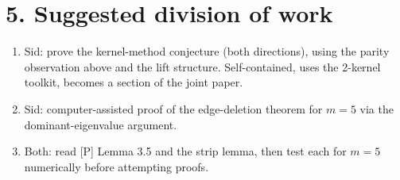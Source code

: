 \documentclass[11pt]{article}
\theoremstyle{remark}\newtheorem*{remark}{Remark}
\begin{document}
\section*{5. Suggested division of work}
\begin{enumerate}[leftmargin=1.5em]
\item Sid: prove the kernel-method conjecture (both directions), using the parity
observation above and the lift structure. Self-contained, uses the 2-kernel toolkit,
becomes a section of the joint paper.
\item Sid: computer-assisted proof of the edge-deletion theorem for $m=5$ via the
dominant-eigenvalue argument.
\item Both: read [P] Lemma 3.5 and the strip lemma, then test each for $m=5$
numerically before attempting proofs.
\end{enumerate}
\end{document}
